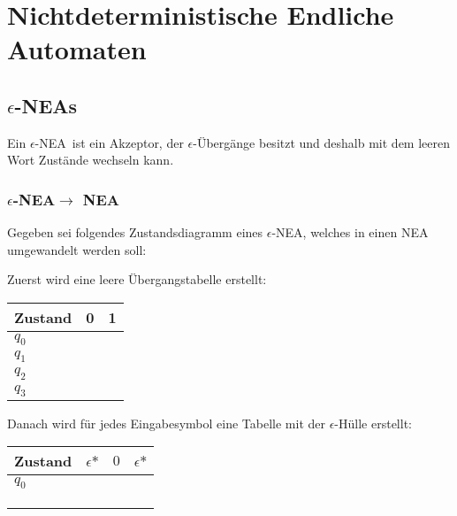 \newcommand{\enea}{$\epsilon$-NEA}
\newcommand{\ehu}{$\epsilon$\text{-Hülle}\ }

\chapter{Nichtdeterministische Endliche Automaten}
\section[Epsilon-NEAs]{\enea s}
\begin{definition}
    Ein \enea\ ist ein Akzeptor, der $\epsilon$-Übergänge besitzt und deshalb mit dem leeren Wort Zustände wechseln kann.
\end{definition}
\subsection[Epsilon-NEA zu NEA]{\enea $\to$ NEA}
Gegeben sei folgendes Zustandsdiagramm eines \enea, welches in einen NEA umgewandelt werden soll:
\begin{figure}[H]
    \centering
    \begin{transitiongraph}[fa]
    \end{transitiongraph}
\end{figure}
Zuerst wird eine leere Übergangstabelle erstellt:
\begin{table}[H]
    \centering
    \begin{tabular}{|l|l|l|}
    \hline
    Zustand & 0 & 1 \\ \hline
    $q_0$   &   &   \\ \hline
    $q_1$   &   &   \\ \hline
    $q_2$   &   &   \\ \hline
    $q_3$   &   &   \\ \hline
    \end{tabular}
\end{table}
Danach wird für jedes Eingabesymbol eine Tabelle mit der $\epsilon$-Hülle erstellt:
\begin{table}[H]
    \centering
    \begin{tabular}{|l|l|l|l|}
    \hline
    Zustand & $\epsilon\mbox{*}$ & $0$   & $\epsilon\mbox{*}$ \\ \hline
    $q_0$   &                    &       &                    \\ \hline
            &                    &       &                    \\ \hline
            &                    &       &                    \\ \hline
            &                    &       &                    \\ \hline
    \end{tabular}
\end{table}
